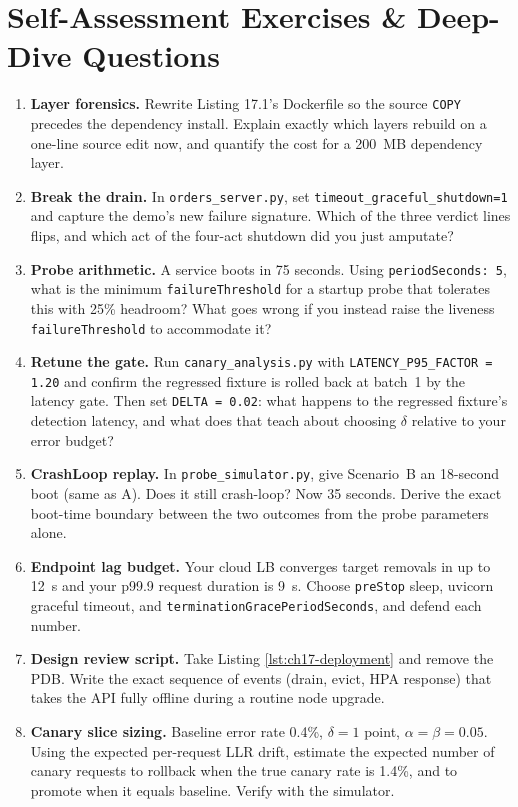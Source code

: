 \section{Self-Assessment Exercises \& Deep-Dive Questions}
\label{sec:ch17-exercises}

\begin{enumerate}[label=\textbf{Exercise 7.\arabic*}, leftmargin=2.9cm]
  \item \textbf{Layer forensics.} Rewrite Listing 17.1's Dockerfile so
        the source \texttt{COPY} precedes the dependency install.
        Explain exactly which layers rebuild on a one-line source edit
        now, and quantify the cost for a 200~MB dependency layer.
  \item \textbf{Break the drain.} In \texttt{orders\_server.py}, set
        \texttt{timeout\_graceful\_shutdown=1} and capture the demo's new
        failure signature. Which of the three verdict lines flips, and
        which act of the four-act shutdown did you just amputate?
  \item \textbf{Probe arithmetic.} A service boots in 75 seconds. Using
        \texttt{periodSeconds: 5}, what is the minimum
        \texttt{failureThreshold} for a startup probe that tolerates this
        with 25\% headroom? What goes wrong if you instead raise the
        liveness \texttt{failureThreshold} to accommodate it?
  \item \textbf{Retune the gate.} Run \texttt{canary\_analysis.py} with
        \texttt{LATENCY\_P95\_FACTOR = 1.20} and confirm the regressed
        fixture is rolled back at batch~1 by the latency gate. Then set
        \texttt{DELTA = 0.02}: what happens to the regressed fixture's
        detection latency, and what does that teach about choosing
        $\delta$ relative to your error budget?
  \item \textbf{CrashLoop replay.} In \texttt{probe\_simulator.py},
        give Scenario~B an 18-second boot (same as A). Does it still
        crash-loop? Now 35 seconds. Derive the exact boot-time boundary
        between the two outcomes from the probe parameters alone.
  \item \textbf{Endpoint lag budget.} Your cloud LB converges target
        removals in up to 12~s and your p99.9 request duration is 9~s.
        Choose \texttt{preStop} sleep, uvicorn graceful timeout, and
        \texttt{terminationGracePeriodSeconds}, and defend each number.
  \item \textbf{Design review script.} Take Listing
        \ref{lst:ch17-deployment} and remove the PDB. Write the exact
        sequence of events (drain, evict, HPA response) that takes the
        API fully offline during a routine node upgrade.
  \item \textbf{Canary slice sizing.} Baseline error rate 0.4\%,
        $\delta = 1$ point, $\alpha = \beta = 0.05$. Using the expected
        per-request LLR drift, estimate the expected number of canary
        requests to rollback when the true canary rate is 1.4\%, and to
        promote when it equals baseline. Verify with the simulator.
\end{enumerate}

